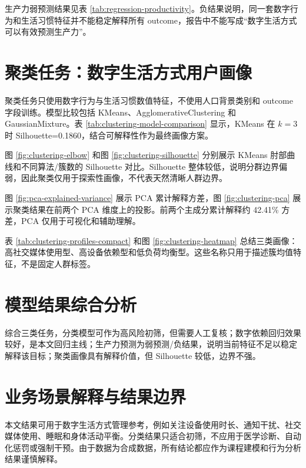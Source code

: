 生产力弱预测结果见表 \ref{tab:regression-productivity}。负结果说明，同一套数字行为和生活习惯特征并不能稳定解释所有 outcome，报告中不能写成“数字生活方式可以有效预测生产力”。



\section{聚类任务：数字生活方式用户画像}

聚类任务只使用数字行为与生活习惯数值特征，不使用人口背景类别和 outcome 字段训练。模型比较包括 KMeans、AgglomerativeClustering 和 GaussianMixture。表 \ref{tab:clustering-model-comparison} 显示，KMeans 在 $k=3$ 时 Silhouette=0.1860，结合可解释性作为最终画像方案。



图 \ref{fig:clustering-elbow} 和图 \ref{fig:clustering-silhouette} 分别展示 KMeans 肘部曲线和不同算法/簇数的 Silhouette 对比。Silhouette 整体较低，说明分群边界偏弱，因此聚类仅用于探索性画像，不代表天然清晰人群边界。



图 \ref{fig:pca-explained-variance} 展示 PCA 累计解释方差，图 \ref{fig:clustering-pca} 展示聚类结果在前两个 PCA 维度上的投影。前两个主成分累计解释约 42.41\% 方差，PCA 仅用于可视化和辅助理解。



表 \ref{tab:clustering-profiles-compact} 和图 \ref{fig:clustering-heatmap} 总结三类画像：高社交媒体使用型、高设备依赖型和低负荷均衡型。这些名称只用于描述簇均值特征，不是固定人群标签。




\section{模型结果综合分析}

综合三类任务，分类模型可作为高风险初筛，但需要人工复核；数字依赖回归效果较好，是本文回归主线；生产力预测为弱预测/负结果，说明当前特征不足以稳定解释该目标；聚类画像具有解释价值，但 Silhouette 较低，边界不强。

\section{业务场景解释与结果边界}

本文结果可用于数字生活方式管理参考，例如关注设备使用时长、通知干扰、社交媒体使用、睡眠和身体活动平衡。分类结果只适合初筛，不应用于医学诊断、自动化惩罚或强制干预。由于数据为合成数据，所有结论都应作为课程建模和行为分析结果谨慎解释。
